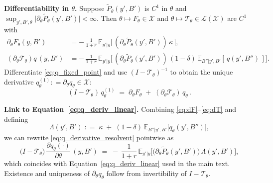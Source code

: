 \documentclass[12pt]{article}
\providecommand{\coloneqq}{\mathrel{\mathop:}=}
\theoremstyle{plain}
\newcommand{\E}{\mathbb{E}}
\begin{document}
\textbf{Differentiability in \(\theta\).} Suppose \(\tilde P_\theta(y',B')\) is \(C^1\) in \(\theta\) and \(\sup_{y',B',\theta}\big|\partial_\theta \tilde P_\theta(y',B')\big|<\infty\). Then \(\theta\mapsto F_\theta\in\mathcal X\) and \(\theta\mapsto \mathcal T_\theta\in\mathcal L(\mathcal X)\) are \(C^1\) with
\begin{align}
	\partial_\theta F_\theta(y,B')               & = -\,\frac{1}{1+r}\,\E_{y'|y}\big[\,(\partial_\theta \tilde P_\theta(y',B'))\,\kappa\,\big], \label{eq:dF}                                   \\
	(\partial_\theta \mathcal T_\theta)q\,(y,B') & = -\,\frac{1}{1+r}\,\E_{y'|y}\Big[\,(\partial_\theta \tilde P_\theta(y',B'))\,(1-\delta)\,\E_{B''|y',B'}[\,q(y',B'')\,] \Big]. \label{eq:dT}
\end{align}
Differentiate \eqref{eq:q_fixed_point} and use \((I-\mathcal T_\theta)^{-1}\) to obtain the unique derivative \(q_\theta^{(1)}\coloneqq\partial_\theta q_\theta\in\mathcal X\):
\begin{equation}\label{eq:q_derivative_resolvent}
	(I-\mathcal T_\theta)\,q_\theta^{(1)}\;=\;\partial_\theta F_\theta\;+\;(\partial_\theta \mathcal T_\theta)\,q_\theta\,.
\end{equation}

\textbf{Link to Equation~\eqref{eq:q_deriv_linear}.} Combining \eqref{eq:dF}–\eqref{eq:dT} and defining
\begin{equation}\label{eq:Lambda_def}
	\Lambda(y',B')\;\coloneqq\;\kappa\;+\;(1-\delta)\,\E_{B''|y',B'}\big[q_\theta(y',B'')\big],
\end{equation}
we can rewrite \eqref{eq:q_derivative_resolvent} pointwise as
\begin{equation}\label{eq:q_deriv_linear_appendix}
	\big(I-\mathcal T_\theta\big)\,\frac{\partial q_\theta(\cdot)}{\partial\theta}\,(y,B')\;=\;-\,\frac{1}{1+r}\,\E_{y'|y}\Big[\big(\partial_\theta \tilde P_\theta(y',B')\big)\,\Lambda(y',B')\Big],
\end{equation}
which coincides with Equation~\eqref{eq:q_deriv_linear} used in the main text. Existence and uniqueness of \(\partial_\theta q_\theta\) follow from invertibility of \(I-\mathcal T_\theta\).



\end{document}
